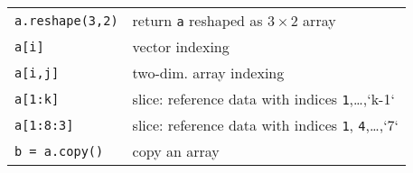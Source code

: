 \documentclass[graybox,sectrefs,envcountresetchap,open=right,final]{svmonodo}
\begin{document}
\begin{center}
{\begin{tabular}{ll}
\texttt{a.reshape(3,2)}  & return \texttt{a} reshaped as $3\times 2$ array                       \\
\texttt{a[i]}            & vector indexing                                                     \\
\texttt{a[i,j]}          & two-dim. array indexing                                             \\
\texttt{a[1:k]}          & slice: reference data with indices \texttt{1},\ldots,`k-1`            \\
\texttt{a[1:8:3]}        & slice: reference data with indices \texttt{1}, \texttt{4},\ldots,`7`    \\
\texttt{b = a.copy()}    & copy an array                                                       \\
\hline
\end{tabular}
\vspace{4mm}
}
\end{center}
\noindent
\end{document}
